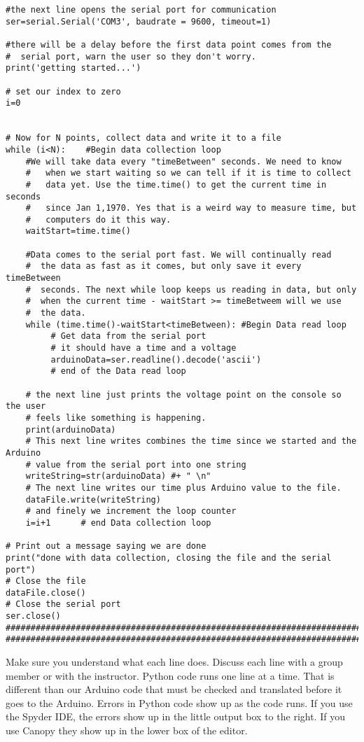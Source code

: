 \begin{verbatim}
#the next line opens the serial port for communication
ser=serial.Serial('COM3', baudrate = 9600, timeout=1)
 
#there will be a delay before the first data point comes from the 
#  serial port, warn the user so they don't worry.
print('getting started...')
 
# set our index to zero
i=0
 
 
# Now for N points, collect data and write it to a file
while (i<N):    #Begin data collection loop
    #We will take data every "timeBetween" seconds. We need to know 
    #   when we start waiting so we can tell if it is time to collect 
    #   data yet. Use the time.time() to get the current time in seconds
    #   since Jan 1,1970. Yes that is a weird way to measure time, but 
    #   computers do it this way.
    waitStart=time.time()
    
    #Data comes to the serial port fast. We will continually read 
    #  the data as fast as it comes, but only save it every timeBetween
    #  seconds. The next while loop keeps us reading in data, but only 
    #  when the current time - waitStart >= timeBetweem will we use 
    #  the data.
    while (time.time()-waitStart<timeBetween): #Begin Data read loop
         # Get data from the serial port
         # it should have a time and a voltage
         arduinoData=ser.readline().decode('ascii')
         # end of the Data read loop
         
    # the next line just prints the voltage point on the console so the user 
    # feels like something is happening.
    print(arduinoData)
    # This next line writes combines the time since we started and the Arduino 
    # value from the serial port into one string
    writeString=str(arduinoData) #+ " \n"
    # The next line writes our time plus Arduino value to the file.
    dataFile.write(writeString)
    # and finely we increment the loop counter
    i=i+1      # end Data collection loop   
    
# Print out a message saying we are done
print("done with data collection, closing the file and the serial port")
# Close the file
dataFile.close()
# Close the serial port   
ser.close() 
###############################################################################
###############################################################################
\end{verbatim}

Make sure you understand what each line does. Discuss each line with a group
member or with the instructor. Python code runs one line at a time. That is
different than our Arduino code that must be checked and translated before
it goes to the Arduino. Errors in Python code show up as the code runs. If
you use the Spyder IDE, the errors show up in the little output box to the
right. If you use Canopy they show up in the lower box of the editor.

